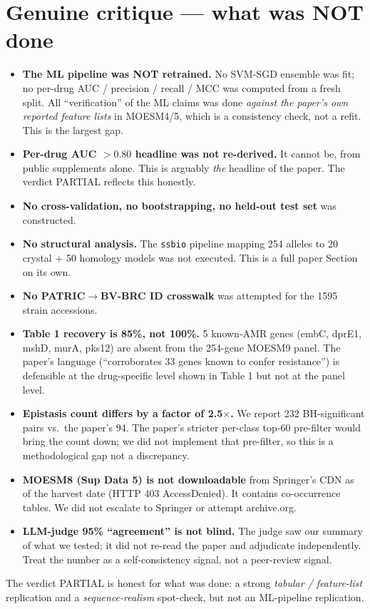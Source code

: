 \documentclass[11pt]{article}
\begin{document}
\section{Genuine critique --- what was NOT done}
\begin{itemize}[leftmargin=1.2em]
  \item \textbf{The ML pipeline was NOT retrained.} No SVM-SGD ensemble was fit; no per-drug
        AUC / precision / recall / MCC was computed from a fresh split. All ``verification'' of
        the ML claims was done \emph{against the paper's own reported feature lists} in MOESM4/5,
        which is a consistency check, not a refit. This is the largest gap.
  \item \textbf{Per-drug AUC $>0.80$ headline was not re-derived.} It cannot be, from public
        supplements alone. This is arguably \emph{the} headline of the paper. The verdict
        PARTIAL reflects this honestly.
  \item \textbf{No cross-validation, no bootstrapping, no held-out test set} was constructed.
  \item \textbf{No structural analysis.} The \texttt{ssbio} pipeline mapping 254 alleles to
        20 crystal + 50 homology models was not executed. This is a full paper Section on its own.
  \item \textbf{No PATRIC$\to$BV-BRC ID crosswalk} was attempted for the 1595 strain accessions.
  \item \textbf{Table 1 recovery is 85\%, not 100\%.} 5 known-AMR genes (embC, dprE1, mshD,
        murA, pks12) are absent from the 254-gene MOESM9 panel. The paper's language
        (``corroborates 33 genes known to confer resistance'') is defensible at the drug-specific
        level shown in Table 1 but not at the panel level.
  \item \textbf{Epistasis count differs by a factor of 2.5$\times$.} We report 232 BH-significant
        pairs vs.\ the paper's 94. The paper's stricter per-class top-60 pre-filter would bring
        the count down; we did not implement that pre-filter, so this is a methodological gap not
        a discrepancy.
  \item \textbf{MOESM8 (Sup Data 5) is not downloadable} from Springer's CDN as of the harvest
        date (HTTP 403 AccessDenied). It contains co-occurrence tables. We did not escalate to
        Springer or attempt archive.org.
  \item \textbf{LLM-judge 95\% ``agreement'' is not blind.} The judge saw our summary of what
        we tested; it did not re-read the paper and adjudicate independently. Treat the number as
        a self-consistency signal, not a peer-review signal.
\end{itemize}
The verdict PARTIAL is honest for what was done: a strong \emph{tabular / feature-list}
replication and a \emph{sequence-realism} spot-check, but not an ML-pipeline replication.
\end{document}
